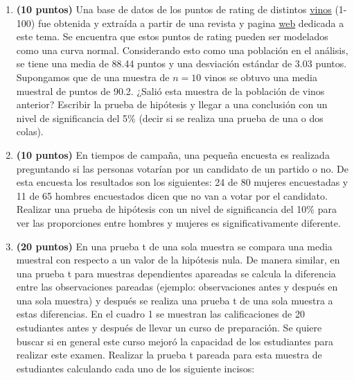\documentclass{article}
\begin{document}
\begin{enumerate}
\item \textbf{(10 puntos)} Una base de datos de los puntos de rating de distintos \href{https://www.kaggle.com/zynicide/wine-reviews}{vinos} (1-100) fue obtenida y extraída a partir de una revista y pagina \href{https://www.winemag.com/?s=&drink_type=wine}{web} dedicada a este tema. Se encuentra que estos puntos de rating pueden ser modelados como una curva normal. Considerando esto como una población en el análisis, se tiene una media de 88.44 puntos y una desviación estándar de 3.03 puntos. Supongamos que de una muestra de $n=10$ vinos se obtuvo una media muestral de puntos de 90.2. ¿Salió esta muestra de la población de vinos anterior? Escribir la prueba de hipótesis y llegar a una conclusión con un nivel de significancia del 5\% (decir si se realiza una prueba de una o dos colas).

\item \textbf{(10 puntos)} En tiempos de campaña, una pequeña encuesta es realizada preguntando si las personas votarían por un candidato de un partido o no. De esta encuesta los resultados son los siguientes: 24 de 80 mujeres encuestadas y 11 de 65 hombres encuestados dicen que no van a votar por el candidato. Realizar una prueba de hipótesis con un nivel de significancia del 10\% para ver las proporciones entre hombres y mujeres es significativamente diferente.


\item \textbf{(20 puntos)} En una prueba t de una sola muestra se compara una media muestral con respecto a un valor de la hipótesis nula. De manera similar, en una prueba t para muestras dependientes apareadas se calcula la diferencia entre las observaciones pareadas (ejemplo: observaciones antes y después en una sola muestra) y después se realiza una prueba t de una sola muestra a estas diferencias. En el cuadro 1 se muestran las calificaciones de 20 estudiantes antes y después de llevar un curso de preparación. Se quiere buscar si en general este curso mejoró la capacidad de los estudiantes para realizar este examen. Realizar la prueba t pareada para esta muestra de estudiantes calculando cada uno de los siguiente incisos:


\end{enumerate}
\end{document}
